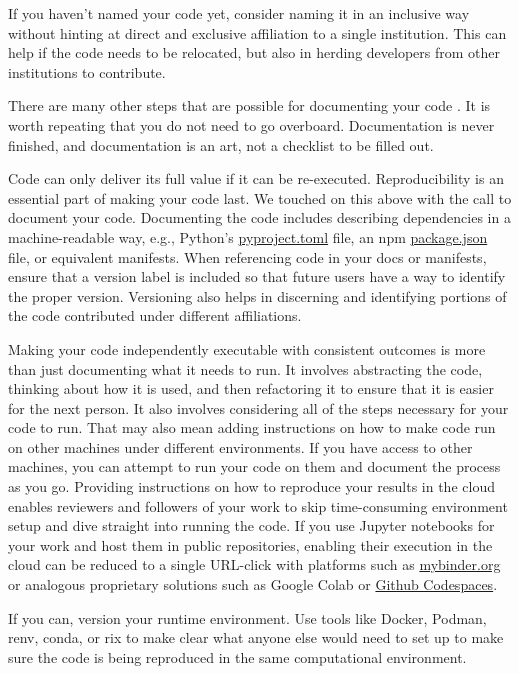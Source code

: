 \documentclass[10pt,letterpaper]{article}
\begin{document}
If you haven't named your code yet,
consider naming it in an inclusive way
without hinting at direct and exclusive affiliation to a single institution.
This can help if the code needs to be relocated,
but also in herding developers from other institutions to contribute.

There are many other steps that are possible for documenting your code \cite{Lee2018}.
It is worth repeating that you do not need to go overboard.
Documentation is never finished,
and documentation is an art,
not a checklist to be filled out.

Code can only deliver its full value if it can be re-executed.
Reproducibility is an essential part of making your code last.
We touched on this above with the call to document your code.
Documenting the code includes describing dependencies in a machine-readable way,
e.g., Python's \href{https://packaging.python.org/en/latest/guides/writing-pyproject-toml/}{pyproject.toml} file,
an npm \href{https://docs.npmjs.com/cli/v10/configuring-npm/package-json?v=true}{package.json} file,
or equivalent manifests.
When referencing code in your docs or manifests,
ensure that a version label is included
so that future users have a way to identify the proper version.
Versioning also helps in discerning and identifying portions of the code contributed under different affiliations.

Making your code independently executable with consistent outcomes
is more than just documenting what it needs to run.
It involves abstracting the code,
thinking about how it is used,
and then refactoring it to ensure that it is easier for the next person.
It also involves considering all of the steps necessary for your code to run.
That may also mean adding instructions on how to make code run on other machines under different environments.
If you have access to other machines,
you can attempt to run your code on them
and document the process as you go.
Providing instructions on how to reproduce your results in the cloud
enables reviewers and followers of your work to skip time-consuming environment setup
and dive straight into running the code.
If you use Jupyter notebooks for your work \cite{Perkel2018}
and host them in public repositories,
enabling their execution in the cloud can be reduced to a single URL-click
with platforms such as \href{http://mybinder.org}{mybinder.org}
or analogous proprietary solutions such as Google Colab
or \href{https://github.com/features/codespaces}{Github Codespaces}.

If you can, version your runtime environment.
Use tools like Docker, Podman, renv, conda, or rix to make clear
what anyone else would need to set up
to make sure the code is being reproduced in the same computational environment.
\end{document}

